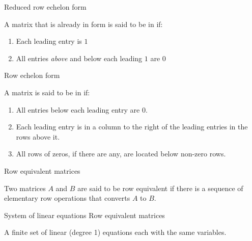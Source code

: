 \documentclass{ximera}
\begin{document}


Reduced row echelon form
\begin{expandable}
    A matrix that is already in  form is said to be in  if:
\begin{enumerate}
\item Each leading entry is $1$
\item All entries {\it above} and below each leading $1$ are $0$
\end{enumerate}
\end{expandable}



Row echelon form
\begin{expandable}
    A matrix is said to be in  if:
\begin{enumerate}
\item All entries below each leading entry are 0.
\item Each leading entry is in a column to the right of the leading entries in the rows above it.
\item All rows of zeros, if there are any, are located below non-zero rows.
\end{enumerate}
\end{expandable}



Row equivalent matrices
\begin{expandable}
    Two matrices $A$ and $B$ are said to be row equivalent if there is a sequence of elementary row operations that converts $A$ to $B$.
\end{expandable}




System of linear equations
Row equivalent matrices
\begin{expandable}
    A finite set of linear (degree 1) equations each with the same variables.
\end{expandable}


\end{document}

